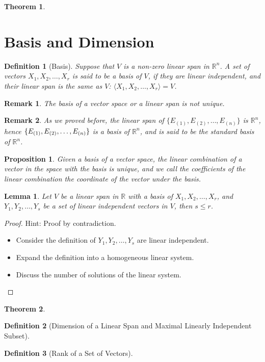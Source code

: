 \documentclass[onecolumn]{ctexart}
\newtheorem{definition}{Definition}
\newtheorem{theorem}{Theorem}
\newtheorem{proposition}{Proposition}
\newtheorem{lemma}{Lemma}
\newtheorem{remark}{Remark}
\begin{document}
\begin{theorem}
  
\end{theorem}

\section{Basis and Dimension}

\begin{definition}[Basis]
  Suppose that $V$ is a non-zero linear span in $\mathbb{R}^n$. A set of vectors
  $X_1, X_2, \ldots, X_r$ is said to be a basis of $V$, if they are linear 
  independent, and their linear span is the same as $V$: $\langle X_1, X_2, 
  \ldots, X_r \rangle = V$.
\end{definition}
\begin{remark}
  The basis of a vector space or a linear span is not unique.
\end{remark}
\begin{remark}
  As we proved before, the linear span of $\lbrace E_{(1)}, E_{(2)}, \ldots, 
  E_{(n)} \rbrace$ is $\mathbb{R}^n$, hence $\lbrace E_{(1)}, E_{(2)}, \ldots,\\ 
  E_{(n)} \rbrace$ is a basis of $\mathbb{R}^n$, and is said to be the standard 
  basis of $\mathbb{R}^n$.
\end{remark}

\begin{proposition}
  Given a basis of a vector space, the linear combination of a vector in the 
  space with the basis is unique, and we call the coefficients of the linear 
  combination the coordinate of the vector under the basis.
\end{proposition}

\begin{lemma}
  Let $V$ be a linear span in $\mathbb{R}$ with a basis of $X_1, X_2, \ldots, 
  X_r$, and $Y_1, Y_2, \ldots, Y_s$ be a set of linear independent vectors in 
  $V$, then $s \leq r$.
\end{lemma}
\begin{proof}
  Hint: Proof by contradiction.
  \begin{itemize}
    \item Consider the definition of $Y_1, Y_2, \ldots, Y_s$ are linear 
    independent.
    \item Expand the definition into a homogeneous linear system.
    \item Discuss the number of solutions of the linear system.
  \end{itemize}
\end{proof}

\begin{theorem}
  
\end{theorem}
\begin{definition}[Dimension of a Linear Span and Maximal Linearly Independent Subset]
  
\end{definition}

\begin{definition}[Rank of a Set of Vectors]
  
\end{definition}
\end{document}

